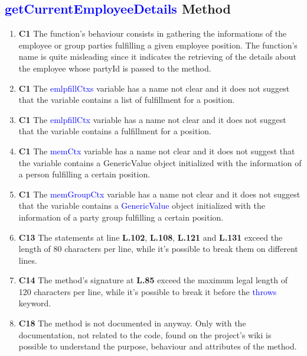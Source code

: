 \subsection{\textcolor{blue}{getCurrentEmployeeDetails} Method}


\begin{enumerate}
	\item \textbf{C1} The function's behaviour consists in gathering the informations of the employee or group parties fulfilling a given employee position.
The function's name is quite misleading since it indicates the retrieving of the details about the employee whose partyId is passed to the method.

	\item \textbf{C1} The \textcolor{blue}{emlpfillCtxs} variable has a name not clear and it does not suggest that the variable contains a list of fulfillment for a position.

	\item \textbf{C1} The \textcolor{blue}{emlpfillCtx} variable has a name not clear and it does not suggest that the variable contains a fulfillment for a position.

	\item \textbf{C1} The \textcolor{blue}{memCtx} variable has a name not clear and it does not suggest that the variable contains a GenericValue object initialized with the information of a person fulfilling a certain position.

	\item \textbf{C1} The \textcolor{blue}{memGroupCtx} variable has a name not clear and it does not suggest that the variable contains a \textcolor{blue}{GenericValue} object initialized with the information of a party group fulfilling a certain position.

	\item \textbf{C13} The statements at line \textbf{L.102}, \textbf{L.108}, \textbf{L.121} and \textbf{L.131} exceed the length of 80 characters per line, while it's possible to break them on different lines.

	\item \textbf{C14} The method's signature at \textbf{L.85} exceed the maximum legal length of 120 characters per line, while it's possible to break it before the \textcolor{blue}{throws} keyword.

	\item \textbf{C18} The method is not documented in anyway. Only with the documentation, not related to the code, found on the project's wiki is possible to understand the purpose,  behaviour and attributes of the method.


\end{enumerate}

